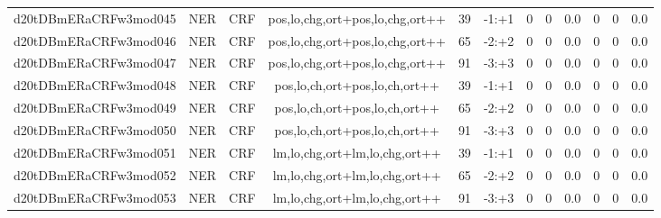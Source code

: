 \documentclass[a4paper]{article}
\begin{document}
\begin{landscape}
\begin{center}
\begin{tabular}{ |c|c|c|c|c|c|c|c|c|c|c|c|}
 
 	
 	\small{ d20tDBmERaCRFw3mod045 } & \small{ NER} & \small{  CRF }  & pos,lo,chg,ort+pos,lo,chg,ort++  &  39 &  \small{  -1:+1 }  &  0 & 0 & 0.0  &  0 & 0 & 0.0 \\
 	

 
 	
 	\small{ d20tDBmERaCRFw3mod046 } & \small{ NER} & \small{  CRF }  & pos,lo,chg,ort+pos,lo,chg,ort++  &  65 &  \small{  -2:+2 }  &  0 & 0 & 0.0  &  0 & 0 & 0.0 \\
 	

 
 	
 	\small{ d20tDBmERaCRFw3mod047 } & \small{ NER} & \small{  CRF }  & pos,lo,chg,ort+pos,lo,chg,ort++  &  91 &  \small{  -3:+3 }  &  0 & 0 & 0.0  &  0 & 0 & 0.0 \\
 	

 
 	
 	\small{ d20tDBmERaCRFw3mod048 } & \small{ NER} & \small{  CRF }  & pos,lo,ch,ort+pos,lo,ch,ort++  &  39 &  \small{  -1:+1 }  &  0 & 0 & 0.0  &  0 & 0 & 0.0 \\
 	

 
 	
 	\small{ d20tDBmERaCRFw3mod049 } & \small{ NER} & \small{  CRF }  & pos,lo,ch,ort+pos,lo,ch,ort++  &  65 &  \small{  -2:+2 }  &  0 & 0 & 0.0  &  0 & 0 & 0.0 \\
 	

 
 	
 	\small{ d20tDBmERaCRFw3mod050 } & \small{ NER} & \small{  CRF }  & pos,lo,ch,ort+pos,lo,ch,ort++  &  91 &  \small{  -3:+3 }  &  0 & 0 & 0.0  &  0 & 0 & 0.0 \\
 	

 
 	
 	\small{ d20tDBmERaCRFw3mod051 } & \small{ NER} & \small{  CRF }  & lm,lo,chg,ort+lm,lo,chg,ort++  &  39 &  \small{  -1:+1 }  &  0 & 0 & 0.0  &  0 & 0 & 0.0 \\
 	

 
 	
 	\small{ d20tDBmERaCRFw3mod052 } & \small{ NER} & \small{  CRF }  & lm,lo,chg,ort+lm,lo,chg,ort++  &  65 &  \small{  -2:+2 }  &  0 & 0 & 0.0  &  0 & 0 & 0.0 \\
 	

 
 	
 	\small{ d20tDBmERaCRFw3mod053 } & \small{ NER} & \small{  CRF }  & lm,lo,chg,ort+lm,lo,chg,ort++  &  91 &  \small{  -3:+3 }  &  0 & 0 & 0.0  &  0 & 0 & 0.0 \\
 	


\end{tabular}
\end{center}
\end{landscape}
\end{document}
